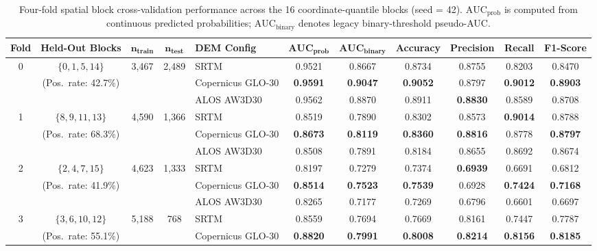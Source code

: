 \documentclass[11pt,twoside]{article}
\begin{document}
\begin{table}[!htbp]
\small
\centering
\caption{Four-fold spatial block cross-validation performance across the 16 coordinate-quantile blocks (seed = 42). $\text{AUC}_{\text{prob}}$ is computed from continuous predicted probabilities; $\text{AUC}_{\text{binary}}$ denotes legacy binary-threshold pseudo-AUC.}
\label{tab:spatial-cv}
\begin{adjustbox}{max width=\textwidth}
\begin{tabular}{c c c c l cccccc}
\toprule
\textbf{Fold} & \textbf{Held-Out Blocks} & $\boldsymbol{n_{\text{train}}}$ & $\boldsymbol{n_{\text{test}}}$ & \textbf{DEM Config} & $\textbf{AUC}_{\textbf{prob}}$ & $\textbf{AUC}_{\textbf{binary}}$ & \textbf{Accuracy} & \textbf{Precision} & \textbf{Recall} & \textbf{F1-Score} \\
\midrule
0 & $\{0, 1, 5, 14\}$ & 3,467 & 2,489 & SRTM & 0.9521 & 0.8667 & 0.8734 & 0.8755 & 0.8203 & 0.8470 \\
  & (Pos.\ rate: 42.7\%) & & & Copernicus GLO-30 & \textbf{0.9591} & \textbf{0.9047} & \textbf{0.9052} & 0.8797 & \textbf{0.9012} & \textbf{0.8903} \\
  & & & & ALOS AW3D30 & 0.9562 & 0.8870 & 0.8911 & \textbf{0.8830} & 0.8589 & 0.8708 \\
\midrule
1 & $\{8, 9, 11, 13\}$ & 4,590 & 1,366 & SRTM & 0.8519 & 0.7890 & 0.8302 & 0.8573 & \textbf{0.9014} & 0.8788 \\
  & (Pos.\ rate: 68.3\%) & & & Copernicus GLO-30 & \textbf{0.8673} & \textbf{0.8119} & \textbf{0.8360} & \textbf{0.8816} & 0.8778 & \textbf{0.8797} \\
  & & & & ALOS AW3D30 & 0.8508 & 0.7891 & 0.8184 & 0.8655 & 0.8692 & 0.8674 \\
\midrule
2 & $\{2, 4, 7, 15\}$ & 4,623 & 1,333 & SRTM & 0.8197 & 0.7279 & 0.7374 & \textbf{0.6939} & 0.6691 & 0.6812 \\
  & (Pos.\ rate: 41.9\%) & & & Copernicus GLO-30 & \textbf{0.8514} & \textbf{0.7523} & \textbf{0.7539} & 0.6928 & \textbf{0.7424} & \textbf{0.7168} \\
  & & & & ALOS AW3D30 & 0.8265 & 0.7177 & 0.7269 & 0.6796 & 0.6601 & 0.6697 \\
\midrule
3 & $\{3, 6, 10, 12\}$ & 5,188 & 768 & SRTM & 0.8559 & 0.7694 & 0.7669 & 0.8161 & 0.7447 & 0.7787 \\
  & (Pos.\ rate: 55.1\%) & & & Copernicus GLO-30 & \textbf{0.8820} & \textbf{0.7991} & \textbf{0.8008} & \textbf{0.8214} & \textbf{0.8156} & \textbf{0.8185} \\

\end{tabular}
\end{adjustbox}
\end{table}
\end{document}
